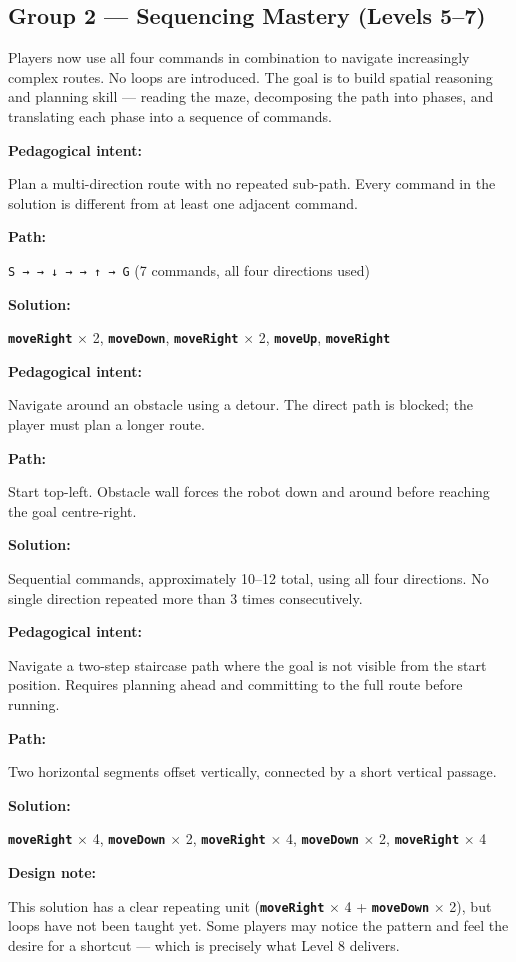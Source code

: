 \documentclass[12pt,a4paper]{article}
\newcommand{\keyword}[1]{\textcolor{keyword}{\texttt{\bfseries #1}}}
\newcommand{\gddfield}[2]{%
  \noindent\begin{minipage}[t]{3.5cm}\bfseries\color{accent}\sffamily#1\end{minipage}%
  \hspace{8pt}%
  \begin{minipage}[t]{\dimexpr\linewidth-3.5cm-8pt\relax}%
    #2
  \end{minipage}\par\smallskip}
\begin{document}
\subsection{Group 2 — Sequencing Mastery (Levels 5--7)}

\begin{tcolorbox}[gddbox, title={Group Design Note}]
Players now use all four commands in combination to navigate increasingly complex routes. No loops are introduced. The goal is to build spatial reasoning and planning skill — reading the maze, decomposing the path into phases, and translating each phase into a sequence of commands.
\end{tcolorbox}

\begin{tcolorbox}[gddbox, title={Level 5 — Mixed Path}]
\gddfield{Pedagogical intent:}{Plan a multi-direction route with no repeated sub-path. Every command in the solution is different from at least one adjacent command.}
\gddfield{Path:}{\texttt{S → → ↓ → → ↑ → G} (7 commands, all four directions used)}
\gddfield{Solution:}{\keyword{moveRight} $\times$ 2, \keyword{moveDown}, \keyword{moveRight} $\times$ 2, \keyword{moveUp}, \keyword{moveRight}}
\end{tcolorbox}

\begin{tcolorbox}[gddbox, title={Level 6 — Detour}]
\gddfield{Pedagogical intent:}{Navigate around an obstacle using a detour. The direct path is blocked; the player must plan a longer route.}
\gddfield{Path:}{Start top-left. Obstacle wall forces the robot down and around before reaching the goal centre-right.}
\gddfield{Solution:}{Sequential commands, approximately 10--12 total, using all four directions. No single direction repeated more than 3 times consecutively.}
\end{tcolorbox}

\begin{tcolorbox}[gddbox, title={Level 7 — Offset Corridor}]
\gddfield{Pedagogical intent:}{Navigate a two-step staircase path where the goal is not visible from the start position. Requires planning ahead and committing to the full route before running.}
\gddfield{Path:}{Two horizontal segments offset vertically, connected by a short vertical passage.}
\gddfield{Solution:}{\keyword{moveRight} $\times$ 4, \keyword{moveDown} $\times$ 2, \keyword{moveRight} $\times$ 4, \keyword{moveDown} $\times$ 2, \keyword{moveRight} $\times$ 4}
\gddfield{Design note:}{This solution has a clear repeating unit (\keyword{moveRight} $\times$ 4 + \keyword{moveDown} $\times$ 2), but loops have not been taught yet. Some players may notice the pattern and feel the desire for a shortcut — which is precisely what Level 8 delivers.}
\end{tcolorbox}
\end{document}
